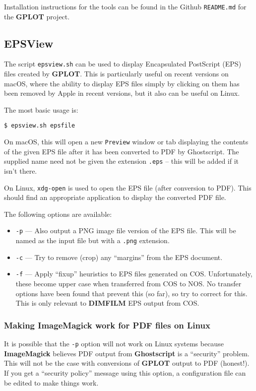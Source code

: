 \documentclass[a4paper,twoside,11pt]{article}
\newcommand{\newpara}{\par\vspace{4mm}\noindent}
\newcommand{\textttc}[1]{\texttt{\textcolor{OurRed}{#1}}}
\begin{document}
\newpara
Installation instructions for the tools can be found in the Github \texttt{README.md} for the \textbf{GPLOT} project.

\subsection{EPSView}
\newpara
The script \texttt{epsview.sh} can be used to display Encapsulated PostScript (EPS) files created by
\textbf{GPLOT}. This is particularly
useful on recent versions on macOS, where the ability to display EPS files simply by clicking on them has been removed
by Apple in recent versions, but it also can be useful on Linux.

\newpara
The most basic usage is:
\begin{lstlisting}
$ epsview.sh epsfile
\end{lstlisting}
On macOS, this will open a new \texttt{Preview} window or tab displaying the contents of the given EPS file after
it has been converted to PDF by Ghostscript. The supplied
name need not be given the extension \texttt{.eps} -- this will be added if it isn't there.

\newpara
On Linux, \texttt{xdg-open} is used to open the EPS file (after conversion to PDF). This should find an
appropriate application to display the converted PDF file.

\newpara
The following options are available:
\begin{itemize}
\item \textttc{-p} --- Also output a PNG image file version of the EPS file.
  This will be named as the input file but with a \texttt{.png}
  extension.
\item \textttc{-c} --- Try to remove (crop) any ``margins'' from the EPS document.
\item \textttc{-f} --- Apply ``fixup'' heuristics to EPS files generated on COS.
  Unfortunately, these become upper case when transferred from COS to NOS. No transfer options
  have been found that prevent this (so far), so try to correct for this. This is only relevant
  to \textbf{DIMFILM} EPS output from COS.
\end{itemize}

\subsubsection{Making ImageMagick work for PDF files on Linux}
\newpara
It is possible that the \texttt{-p} option will not work on Linux systems because \textbf{ImageMagick} believes PDF output
from \textbf{Ghostscript} is a ``security'' problem. This will not be the case with conversions of \textbf{GPLOT} output
to PDF (honest!). If you get a ``security policy'' message using this option, a configuration file can be
edited to make things work.
\end{document}
